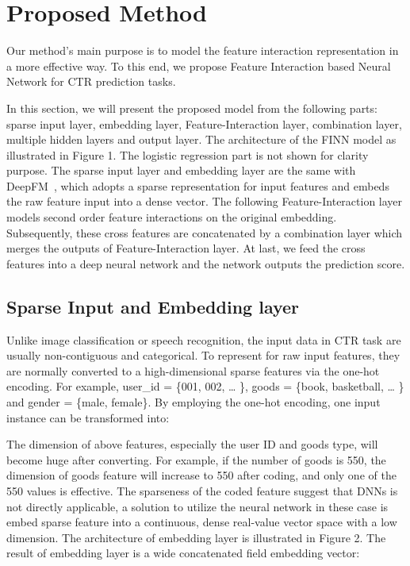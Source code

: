 \documentclass[journal]{IEEEtran}
\begin{document}
\section{Proposed Method}
Our method’s main purpose is  to model the feature interaction representation in a more effective way. To this end, we propose Feature Interaction based Neural Network for CTR prediction tasks.

In this section, we will present the proposed model from the following parts: sparse input layer, embedding layer, Feature-Interaction layer, combination layer, multiple hidden layers and output layer. The architecture of the FINN model as illustrated in Figure 1. The logistic regression part is not shown for clarity purpose. The sparse input layer and embedding layer are the same with DeepFM~\cite{56}, which adopts a sparse representation for input features and embeds the raw feature input into a dense vector. The following Feature-Interaction layer models second order feature interactions on the original embedding. Subsequently, these cross features are concatenated by a combination layer which merges the outputs of Feature-Interaction layer. At last, we feed the cross features into a deep neural network and the network outputs the prediction score.
\subsection{Sparse Input and Embedding layer}
Unlike image classification or speech recognition, the input data in CTR task are usually non-contiguous and categorical. To represent for raw input features, they are normally converted to a high-dimensional sparse features via the one-hot encoding. For example, user\_id = \{001, 002, … \}, goods = \{book, basketball, … \} and gender = \{male, female\}. By employing the one-hot encoding, one input instance can be transformed into:

The dimension of above features, especially the user ID and goods type, will become huge after converting. For example, if the number of goods is 550, the dimension of goods feature will increase to 550 after coding, and only one of the 550 values is effective. The sparseness of the coded feature suggest that DNNs is not directly applicable, a solution to utilize the neural network in these case is embed sparse feature into a continuous, dense real-value vector space with a low dimension. The architecture of embedding layer is illustrated in Figure 2. The result of embedding layer is a wide concatenated field embedding vector: 
\end{document}
